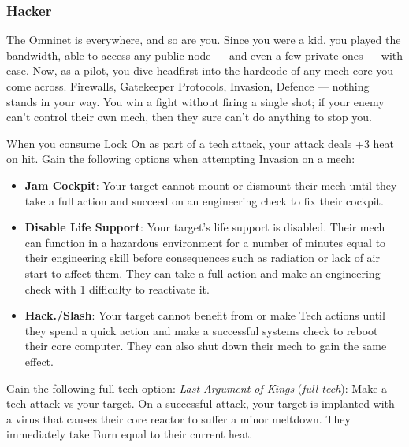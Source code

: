 \subsubsection{Hacker}

\begin{talent}
{The Omninet is everywhere, and so are you. Since you were a kid, you played the bandwidth, able to access any public node — and even a few private ones — with ease. Now, as a pilot, you dive headfirst into the hardcode of any mech core you come across. Firewalls, Gatekeeper Protocols, Invasion, Defence — nothing stands in your way. You win a fight without firing a single shot; if your enemy can’t control their own mech, then they sure can’t do anything to stop you.}

When you consume Lock On as part of a tech attack, your attack deals +3 heat on hit. 
Gain the following options when attempting Invasion on a mech: 
\begin{itemize}
\item \textbf{Jam Cockpit}: Your target cannot mount or dismount their mech until they take a full action and succeed on an engineering check to fix their cockpit.
\item \textbf{Disable Life Support}: Your target’s life support is disabled. Their mech can function in a hazardous environment for a number of minutes equal to their engineering skill before consequences such as radiation or lack of air start to affect them. They can take a full action and make an engineering check with 1 difficulty to reactivate it.
\item \textbf{Hack./Slash}: Your target cannot benefit from or make Tech actions until they spend a quick action and make a successful systems check to reboot their core computer. They can also shut down their mech to gain the same effect.
\end{itemize}
Gain the following full tech option:\newline
\textit{Last Argument of Kings} (\textit{full tech}): Make a tech attack vs your target. On a successful attack, your target is implanted with a virus that causes their core reactor to suffer a minor meltdown. They immediately take Burn equal to their current heat.
\end{talent}
